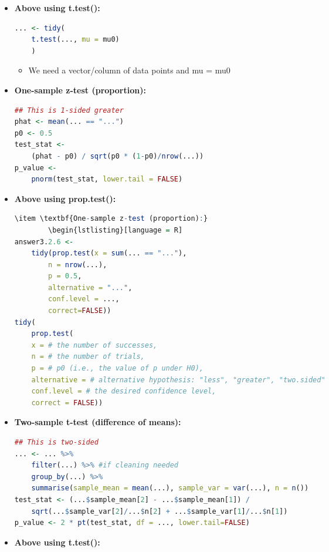 \documentclass[8pt,landscape,a4paper, fleqn, dvipsnames]{extarticle}
\begin{document}
\begin{multicols*}{4}
\begin{itemize}
\begin{lstlisting}[language = R]
        \end{lstlisting}
    \item \textbf{Above using t.test():}
        \begin{lstlisting}[language = R]
... <- tidy(
    t.test(..., mu = mu0)
    )
        \end{lstlisting}
        \begin{itemize}
            \item We need a vector/column of data points and mu = mu0
        \end{itemize}
        \item \textbf{One-sample z-test (proportion):}
        \begin{lstlisting}[language = R]
## This is 1-sided greater
phat <- mean(... == "...")
p0 <- 0.5
test_stat <- 
    (phat - p0) / sqrt(p0 * (1-p0)/nrow(...))
p_value <- 
    pnorm(test_stat, lower.tail = FALSE)
        \end{lstlisting}
        \item \textbf{Above using prop.test():}
        \begin{lstlisting}[language = R]
\item \textbf{One-sample z-test (proportion):}
        \begin{lstlisting}[language = R]
answer3.2.6 <- 
    tidy(prop.test(x = sum(... == "..."), 
        n = nrow(...), 
        p = 0.5, 
        alternative = "...", 
        conf.level = ...,
        correct=FALSE))
tidy(
    prop.test(
    x = # the number of successes,
    n = # the number of trials, 
    p = # p0 (i.e., the value of p under H0),
    alternative = # alternative hypothesis: "less", "greater", "two.sided"
    conf.level = # the desired confidence level,
    correct = FALSE))
        \end{lstlisting}
        \item \textbf{Two-sample t-test (difference of means):}
        \begin{lstlisting}[language = R]
## This is two-sided
... <- ... %>% 
    filter(...) %>% #if cleaning needed
    group_by(...) %>% 
    summarise(sample_mean = mean(...), sample_var = var(...), n = n())
test_stat <- (...$sample_mean[2] - ...$sample_mean[1]) / 
    sqrt(...$sample_var[2]/...$n[2] + ...$sample_var[1]/...$n[1])
p_value <- 2 * pt(test_stat, df = ..., lower.tail=FALSE)
        \end{lstlisting}
        \item \textbf{Above using t.test():}
        \begin{lstlisting}[language = R]

\end{lstlisting}
\end{itemize}
\end{multicols*}
\end{document}

